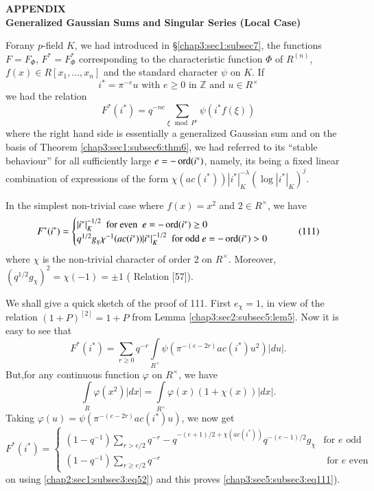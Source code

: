 \begin{center}
  {\LARGE\bf APPENDIX}\\[10pt]
  {\LARGE\bf Generalized Gaussian Sums and Singular Series (Local Case)}
\end{center}
\smallskip


For\pageoriginale any $p$-field $K$, we had introduced in
\S \ref{chap3:sec1:subsec7}, the
functions $F=F_{\Phi}$, $F^{\ast}=F^{\ast}_{\Phi}$ corresponding to
the characteristic function $\Phi$ of $R^{(n)}$, $f(x)\in
R[x_{1},\ldots,x_{n}]$ and the standard character $\psi$ on $K$. If
$$
i^{\ast}=\pi^{-e}u\text{ \ with \ } e\geq 0\text{ \  in \ }
\mathbb{Z}\text{ \  and \ } u\in R^{\times}
$$
we had the relation
$$
F^{\ast}(i^{\ast})=q^{-ne}\sum_{\xi\mod P^{e}}\psi(i^{\ast}f(\xi))
$$
where the right hand side is essentially a generalized Gaussian sum
and on the basis of Theorem \ref{chap3:sec1:subsec6:thm6}, we had referred to its
``stable behaviour'' for all sufficiently large $e=-\operatorname{ord}(i^{\ast})$,
namely, its being a fixed linear combination of expressions of the
form $\chi(ac(i^{\ast}))|i^{\ast}|^{-\lambda}_{K}(\log
|i^{\ast}|_{K})^{j}$. 

In the simplest non-trivial case where $f(x)=x^{2}$ and $2\in
R^{\times}$, we have
\begin{equation*}
F^{\ast}(i^{\ast})=
\begin{cases}
|i^{\ast}|^{-1/2}_{K}\text{ \ for even \ } e=-\operatorname{ord}(i^{\ast})\geq 0\\
q^{1/2}g_{\chi}\chi^{-1}(ac(i^{\ast}))|i^{\ast}|^{-1/2}_{K}\text{
  \ for odd }e=-\operatorname{ord}(i^{\ast})>0
\end{cases}\tag{111}\label{chap3:sec5:subsec3:eq111}
\end{equation*}
where $\chi$ is the non-trivial character of order 2 on
$R^{\times}$. Moreover,\break $(q^{1/2}g_{\chi})^{2}=\chi(-1)=\pm 1$ (\cf
Relation [57]).

We shall give a quick sketch of the proof of {111}. First
$e_{\chi}=1$, in view of the relation $(1+P)^{[2]}=1+P$ from 
Lemma \ref{chap3:sec2:subsec5:lem5}. Now it is easy to see that
$$
F^{\ast}(i^{\ast})=\sum_{r\geq
  0}q^{-r}\int\limits_{R^{\times}}\psi(\pi^{-(e-2r)}ac(i^{\ast})u^{2})|du|.
$$
But,\pageoriginale for any continuous function $\varphi$ on
$R^{\times}$, we have
$$
\int\limits_{R}\varphi(x^{2})|dx|=\int\limits_{R^{\times}}\varphi(x)(1+\chi(x))|dx|.
$$
Taking $\varphi(u)=\psi(\pi^{-(e-2r)}ac(i^{\ast})u)$, we now get
$$
F^{\ast}(i^{\ast})=
\begin{cases}
(1-q^{-1})\sum\limits_{r>e/2}q^{-r}-q^{-(e+1)/2+\chi(ac(i^{\ast}))}q^{-(e-1)/2}g_{\chi}
  & \text{for } e \text{ odd}\\
(1-q^{-1})\sum\limits_{r\geq e/2}q^{-r} & \text{ for } e \text{ even}
\end{cases}
$$
on using \ref{chap2:sec1:subsec3:eq52}) and this
proves \ref{chap3:sec5:subsec3:eq111}).

